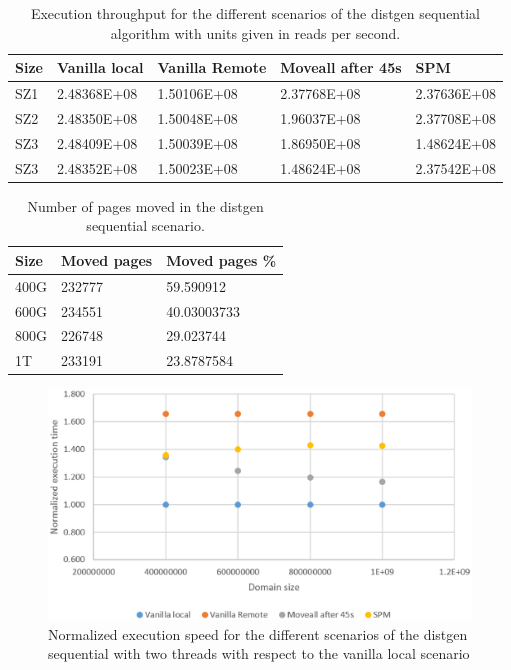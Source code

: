 \begin{table}[th]
	\centering
		\begin{tabularx}{\textwidth}{|l|l|l|l|X|}
		\hline
			Size & Vanilla local & Vanilla Remote & Moveall after 45s & SPM \\
			\hline
			SZ1 & 2.48368E+08 & 1.50106E+08 & 2.37768E+08 & 2.37636E+08\\
			\hline
			SZ2 & 2.48350E+08 & 1.50048E+08 & 1.96037E+08 & 2.37708E+08\\
			\hline
			SZ3 & 2.48409E+08 & 1.50039E+08 & 1.86950E+08 & 1.48624E+08\\
			\hline
			SZ3 & 2.48352E+08 & 1.50023E+08 & 1.48624E+08 & 2.37542E+08\\
			\hline
		\end{tabularx}
		\caption{Execution throughput for the different scenarios of the distgen sequential algorithm with units given in reads per second.}
		\label{table:table:res-tbl-dgentimseq2t}
\end{table}

\begin{table}[th]
	\centering
		\begin{tabularx}{\textwidth}{|l|l|X|}
		\hline
			Size & Moved pages & Moved pages \%  \\
			\hline
			400G & 232777 & 59.590912 \\
			\hline
			600G & 234551 & 40.03003733\\
			\hline
			800G & 226748 & 29.023744 \\
			\hline
			1T & 233191 & 23.8787584 \\
			\hline
		\end{tabularx}
		\caption{Number of pages moved in the distgen sequential scenario.}
		\label{table:res-tbl-dgenmvdseq2t}
\end{table}

\begin{figure}[th]
	\centering
		\includegraphics[width=.8\textwidth]{figures/time-dgentt-ser.eps}
		\caption{Normalized execution speed for the different scenarios of the distgen sequential with two threads with respect to the vanilla local scenario}
		\label{fig:time-dgentt-ser}
\end{figure}

